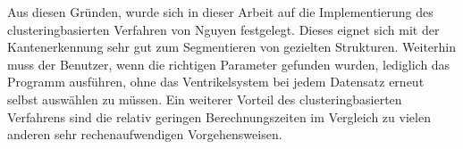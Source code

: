 Aus diesen Gründen, wurde sich in dieser Arbeit auf die Implementierung des clusteringbasierten Verfahren von Nguyen \cite{nguyen2012clustering} festgelegt. Dieses eignet sich mit der Kantenerkennung sehr gut zum Segmentieren von gezielten Strukturen.
\newline
Weiterhin muss der Benutzer, wenn die richtigen Parameter gefunden wurden, lediglich das Programm ausführen, ohne das Ventrikelsystem bei jedem Datensatz erneut selbst auswählen zu müssen.
\newline
Ein weiterer Vorteil des clusteringbasierten Verfahrens sind die relativ geringen Berechnungszeiten im Vergleich zu vielen anderen sehr rechenaufwendigen Vorgehensweisen. 























































